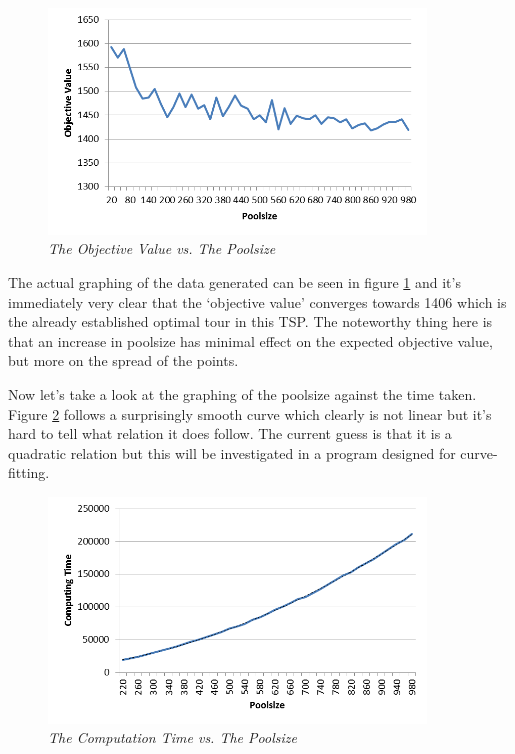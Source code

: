 \begin{figure}[h] 
\centering
\includegraphics[height=6cm]{OVP}
\caption{\textsl{The Objective Value vs. The Poolsize}}
\label{OVP}
\end{figure}

The actual graphing of the data generated can be seen in figure \ref{OVP} and it’s immediately very clear that the ‘objective value’ converges towards 1406 which is the already established optimal tour in this TSP. The noteworthy thing here is that an increase in poolsize has minimal effect on the expected objective value, but more on the spread of the points.




\par
Now let’s take a look at the graphing of the poolsize against the time taken. 
Figure \ref{CTP} follows a surprisingly smooth curve which clearly is not linear but it’s hard to tell what relation it does follow. The current guess is that it is a quadratic relation but this will be investigated in a program designed for curve-fitting.

\begin{figure}[h] 
	\centering
	\includegraphics[height=6cm]{CTP}
	\caption{\textsl{The Computation Time vs. The Poolsize}}
	\label{CTP}
\end{figure}



